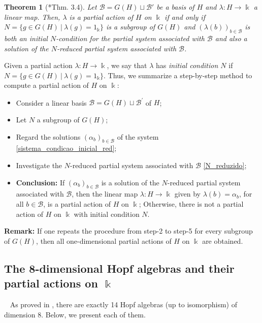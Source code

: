 \documentclass[reqno]{amsart}
\newtheorem{thm}{Theorem}[section]
\theoremstyle{definition}
\numberwithin{equation}{section}\theoremstyle{plain}
\newcommand{\B}{\mathcal{B}}
\theoremstyle{definition}
\def \k {\Bbbk}
\begin{document}
\begin{thm}[\cite{corresponding}*{Thm. 3.4}]
	Let $\B = G(H) \sqcup \B'$ be a basis of $H$ and $\lambda: H \to \k$ a linear map.
	Then, $\lambda$ is a partial action of $H$ on $\k$ if and only if $N=\{g \in G(H) \ | \ \lambda(g)=1_\k\}$ is a subgroup of $G(H)$ and $(\lambda(b))_{b \in \B} $ is both an initial $N$-condition for the partial system associated with $\B$ and also a solution of the $N$-reduced partial system associated with $\B$.
\end{thm}

\medbreak
	
	Given a partial action $\lambda: H \longrightarrow \k$, we say that $\lambda$ has \emph{initial condition $N$} if $N=\{ g \in G(H) \ | \ \lambda(g)=1_\k \}$.
Thus, we summarize a step-by-step method to compute a partial action of $H$ on $\k$:
\begin{itemize}
	\item[\textbf{Step 1.}] Consider a linear basis $\B=G(H)\sqcup\B^\prime$ of $H$;
	\item[\textbf{Step 2.}] Let $N$ a subgroup of $G(H)$;
	\item[\textbf{Step 3.}] Regard the solutions $(\alpha_b)_{b \in \B}$ of the system \eqref{sistema_condicao_inicial_red};
	\item[\textbf{Step 4.}] Investigate the $N$-reduced partial system associated with $\B$ \eqref{N_reduzido};
	\item[\textbf{Step 5.}] \textbf{Conclusion:} If $(\alpha_b)_{b \in \B}$ is a solution of the $N$-reduced partial system associated with $\B$, then the linear map $\lambda: H \longrightarrow \k$ given by $\lambda(b)=\alpha_b$, for all $b \in \B$, is a partial action of $H$ on $\k$;
	Otherwise, there is not a partial action of $H$ on $\k$ with initial condition $N$.
\end{itemize}
\textbf{Remark:} If one repeats the procedure from step-2 to step-5 for every subgroup of $G(H)$, then all one-dimensional partial actions of $H$ on $\k$ are obtained.

\medbreak

\subsection{The 8-dimensional Hopf algebras and their partial actions on \texorpdfstring{\(\Bbbk\)}{k}}

\label{subsec:8dim_Hopf}
 
\ \newline
 As proved in \cite{stefan}, there are exactly 14 Hopf algebras (up to isomorphism) of  dimension 8.
 Below, we present each of them.
\end{document}
